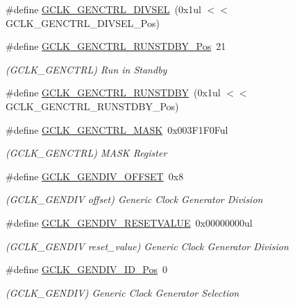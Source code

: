 \begin{DoxyCompactItemize}
\#define \mbox{\hyperlink{group___s_a_m_d21___g_c_l_k_ga5b38723ccce77a0257a48ce83389b204}{G\+C\+L\+K\+\_\+\+G\+E\+N\+C\+T\+R\+L\+\_\+\+D\+I\+V\+S\+EL}}~(0x1ul $<$$<$ G\+C\+L\+K\+\_\+\+G\+E\+N\+C\+T\+R\+L\+\_\+\+D\+I\+V\+S\+E\+L\+\_\+\+Pos)
\item 
\#define \mbox{\hyperlink{group___s_a_m_d21___g_c_l_k_ga74904f6bd2b8ead6cfffae549a41b869}{G\+C\+L\+K\+\_\+\+G\+E\+N\+C\+T\+R\+L\+\_\+\+R\+U\+N\+S\+T\+D\+B\+Y\+\_\+\+Pos}}~21
\begin{DoxyCompactList}\small\item\em (G\+C\+L\+K\+\_\+\+G\+E\+N\+C\+T\+RL) Run in Standby \end{DoxyCompactList}\item 
\#define \mbox{\hyperlink{group___s_a_m_d21___g_c_l_k_ga892b6d79b97157d48d189804f91df4fa}{G\+C\+L\+K\+\_\+\+G\+E\+N\+C\+T\+R\+L\+\_\+\+R\+U\+N\+S\+T\+D\+BY}}~(0x1ul $<$$<$ G\+C\+L\+K\+\_\+\+G\+E\+N\+C\+T\+R\+L\+\_\+\+R\+U\+N\+S\+T\+D\+B\+Y\+\_\+\+Pos)
\item 
\#define \mbox{\hyperlink{group___s_a_m_d21___g_c_l_k_gab6d617a227f5a570e43959099ae10b1d}{G\+C\+L\+K\+\_\+\+G\+E\+N\+C\+T\+R\+L\+\_\+\+M\+A\+SK}}~0x003\+F1\+F0\+Ful
\begin{DoxyCompactList}\small\item\em (G\+C\+L\+K\+\_\+\+G\+E\+N\+C\+T\+RL) M\+A\+SK Register \end{DoxyCompactList}\item 
\#define \mbox{\hyperlink{group___s_a_m_d21___g_c_l_k_ga2922a2f237f943cf8a023d3311ca5128}{G\+C\+L\+K\+\_\+\+G\+E\+N\+D\+I\+V\+\_\+\+O\+F\+F\+S\+ET}}~0x8
\begin{DoxyCompactList}\small\item\em (G\+C\+L\+K\+\_\+\+G\+E\+N\+D\+IV offset) Generic Clock Generator Division \end{DoxyCompactList}\item 
\#define \mbox{\hyperlink{group___s_a_m_d21___g_c_l_k_ga886387ce3e41b7ca629a0b6a2292a6c0}{G\+C\+L\+K\+\_\+\+G\+E\+N\+D\+I\+V\+\_\+\+R\+E\+S\+E\+T\+V\+A\+L\+UE}}~0x00000000ul
\begin{DoxyCompactList}\small\item\em (G\+C\+L\+K\+\_\+\+G\+E\+N\+D\+IV reset\+\_\+value) Generic Clock Generator Division \end{DoxyCompactList}\item 
\#define \mbox{\hyperlink{group___s_a_m_d21___g_c_l_k_ga26ff4637fd9d6b561a910aeee96a4f88}{G\+C\+L\+K\+\_\+\+G\+E\+N\+D\+I\+V\+\_\+\+I\+D\+\_\+\+Pos}}~0
\begin{DoxyCompactList}\small\item\em (G\+C\+L\+K\+\_\+\+G\+E\+N\+D\+IV) Generic Clock Generator Selection \end{DoxyCompactList}\item 

\end{DoxyCompactItemize}
